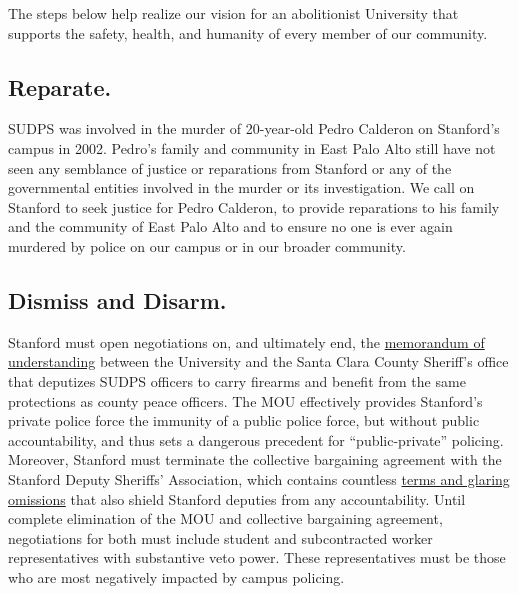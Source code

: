 \documentclass[12pt, titlepage, letterpaper]{article}
\begin{document}
The steps below help realize our vision for an abolitionist University that supports the safety, health, and humanity of every member of our community.

\subsection*{Reparate.}
%
SUDPS was involved in the murder of 20-year-old Pedro Calderon on Stanford’s campus in 2002. Pedro’s family and community in East Palo Alto still have not seen any semblance of justice or reparations from Stanford or any of the governmental entities involved in the murder or its investigation. We call on Stanford to seek justice for Pedro Calderon, to provide reparations to his family and the community of East Palo Alto and to ensure no one is ever again murdered by police on our campus or in our broader community.

\subsection*{Dismiss and Disarm.}
%
Stanford must open negotiations on, and ultimately end, the \href{http://sccgov.iqm2.com/Citizens/FileOpen.aspx?Type=4&ID=48992}{memorandum of understanding} between the University and the Santa Clara County Sheriff’s office that deputizes SUDPS officers to carry firearms and benefit from the same protections as county peace officers. The MOU effectively provides Stanford’s private police force the immunity of a public police force, but without public accountability, and thus sets a dangerous precedent for ``public-private” policing. Moreover, Stanford must terminate the collective bargaining agreement with the Stanford Deputy Sheriffs’ Association, which contains countless \href{https://docs.google.com/document/d/1v-WZPdZZnrDKqexZeMun8nixbeN0O6rEHawJTUglfBM/edit?usp=sharing}{terms and glaring omissions} that also shield Stanford deputies from any accountability. Until complete elimination of the MOU and collective bargaining agreement, negotiations for both must include student and subcontracted worker representatives with substantive veto power. These representatives must be those who are most negatively impacted by campus policing. 
\end{document}
